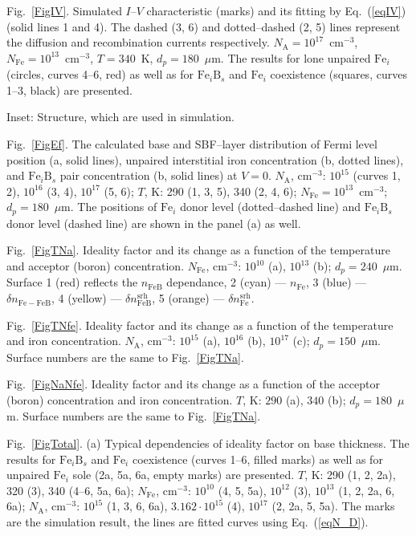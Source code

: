 \documentclass[12pt]{article}
\begin{document}
 Fig.~\ref{FigIV}.
Simulated $I$--$V$ characteristic (marks) and its fitting by Eq.~(\ref{eqIV}) (solid lines 1 and 4).
The dashed (3, 6) and dotted–dashed (2, 5) lines represent the diffusion and recombination currents respectively.
$N_\mathrm{A}=10^{17}$~cm$^{-3}$, $N_\mathrm{Fe}=10^{13}$~cm$^{-3}$, $T=340$~K, $d_p=180$~$\mu$m.
The results for lone unpaired $\mathrm{Fe}_i$ (circles, curves 4--6, red) as well as for $\mathrm{Fe}_i\mathrm{B}_s$ and $\mathrm{Fe}_i$ coexistence
(squares, curves 1--3, black) are presented.

Inset: Structure, which are used in simulation.



 Fig.~\ref{FigEf}.
The calculated base and SBF--layer distribution of Fermi level position (a, solid lines), unpaired interstitial iron concentration (b, dotted lines),
and $\mathrm{Fe}_i\mathrm{B}_s$ pair concentration (b, solid lines) at $V=0$.
$N_\mathrm{A}$, cm$^{-3}$: $10^{15}$ (curves 1, 2), $10^{16}$ (3, 4), $10^{17}$ (5, 6);
$T$, K: 290 (1, 3, 5), 340 (2, 4, 6);
$N_\mathrm{Fe}=10^{13}$~cm$^{-3}$;
$d_p=180$~$\mu$m.
The positions of $\mathrm{Fe}_i$ donor level (dotted--dashed line) and $\mathrm{Fe}_i\mathrm{B}_s$
 donor level (dashed line) are shown in the panel (a) as well.

 Fig.~\ref{FigTNa}.
Ideality factor and its change as a function of the temperature and acceptor (boron) concentration.
$N_\mathrm{Fe}$, cm$^{-3}$: $10^{10}$ (a), $10^{13}$ (b);
$d_p=240$~$\mu$m.
Surface 1 (red) reflects the  $n_\mathrm{FeB}$ dependance,
2 (cyan) ---  $n_\mathrm{Fe}$,
3 (blue) --- $\delta n_\mathrm{Fe-FeB}$,
4 (yellow) --- $\delta n_\mathrm{FeB}^\mathrm{srh}$,
5 (orange) --- $\delta n_\mathrm{Fe}^\mathrm{srh}$.


 Fig.~\ref{FigTNfe}.
Ideality factor and its change as a function of the temperature and iron concentration.
$N_\mathrm{A}$, cm$^{-3}$: $10^{15}$ (a), $10^{16}$ (b), $10^{17}$ (c);
$d_p=150$~$\mu$m.
Surface numbers are the same to Fig.~\ref{FigTNa}.

 Fig.~\ref{FigNaNfe}.
Ideality factor and its change as a function of the acceptor (boron) concentration and iron concentration.
$T$, K: $290$ (a), $340$ (b);
$d_p=180$~$\mu$m.
Surface numbers are the same to Fig.~\ref{FigTNa}.


 Fig.~\ref{FigTotal}.
(a) Typical dependencies of ideality factor on base thickness.
The results for $\mathrm{Fe}_i\mathrm{B}_s$ and $\mathrm{Fe}_i$ coexistence (curves 1--6, filled marks)
as well as for unpaired $\mathrm{Fe}_i$ sole (2a, 5a, 6a, empty marks) are presented.
$T$, K: 290 (1, 2, 2a), 320 (3), 340 (4--6, 5a, 6a);
$N_\mathrm{Fe}$, cm$^{-3}$: $10^{10}$ (4, 5, 5a), $10^{12}$ (3), $10^{13}$ (1, 2, 2a, 6, 6a);
$N_\mathrm{A}$, cm$^{-3}$: $10^{15}$ (1, 3, 6, 6a), $3.162\cdot10^{15}$ (4),  $10^{17}$ (2, 2a, 5, 5a).
The marks are the simulation result,
the lines are fitted curves using Eq.~(\ref{eqN_D}).
\end{document}
